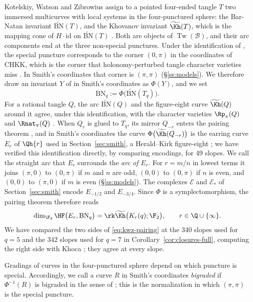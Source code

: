 Kotelskiy, Watson and Zibrowius assign to a pointed four-ended tangle $T$ two immersed multicurves
with local systems in the four-punctured sphere: the Bar-Natan invariant $\widetilde{\mathrm{BN}}(T)$,
and the Khovanov invariant $\widetilde{\Kh}(T)$, which is the mapping cone of $H\cdot\mathrm{id}$ on
$\widetilde{\mathrm{BN}}(T)$ \cite[Def.~6.5]{KWZ}.  Both are objects of $\operatorname{Tw}(\mathcal B)$,
and their arc components end at the three non-special punctures.  Under the identification of
\cite[\S8.2]{KWZ}, the special puncture corresponds to the
corner $(0,\pi)$ in the coordinates of CHKK, which is the corner that
holonomy-perturbed tangle character varieties miss \cite[Prop.~11.1 and \S11.6]{CHKK}.  In Smith's coordinates
that corner is $(\pi,\pi)$ (\S\ref{ss:models}).  We therefore draw an invariant $Y$ of \cite{KWZ} in Smith's
coordinates as $\Phi(Y)$, and we set
\[
 \mathrm{BN}_q:=\Phi\bigl(\widetilde{\mathrm{BN}}(T_q)\bigr).
\]
For a rational tangle $Q$, the arc $\widetilde{\mathrm{BN}}(Q)$ and the figure-eight curve
$\widetilde{\Kh}(Q)$ around it agree, under this identification, with the character varieties
$\Rp_\pi(Q)$ and $\Rnat_\pi(Q)$ \cite[\S1.8 and \S8.2]{KWZ}.  When $Q_r$ is glued to $T_q$, its
mirror $Q_{-r}$ enters the pairing theorem \cite[Thm.~1.9]{KWZ}, and in Smith's coordinates the curve
$\Phi\bigl(\widetilde{\Kh}(Q_{-r})\bigr)$ is the earring curve $E_r$ of $\Qh{r}$ used in
Section~\ref{sec:smith}, a Herald--Kirk figure-eight \cite[Def.~6.7]{HK}; we have verified this
identification directly, by comparing encodings, for 49 slopes.  We call the straight arc that $E_r$
surrounds the \emph{arc of $E_r$}.  For $r=m/n$ in lowest terms it joins $(\pi,0)$ to $(0,\pi)$ if $m$
and $n$ are odd, $(0,0)$ to $(0,\pi)$ if $n$ is even, and $(0,0)$ to $(\pi,0)$ if $m$ is even
(\S\ref{ss:models}).  The complexes $\mathcal E$ and $\mathcal E_*$ of
Section~\ref{sec:smith} encode $E_{-1/2}$ and $E_{-3/4}$.  Since $\Phi$ is a symplectomorphism, the
pairing theorem therefore reads
\begin{equation}\label{eq:kwz-pairing}
 \dim_{\F_2}\HF\bigl(E_r,\mathrm{BN}_q\bigr)=\rk\widetilde{\Kh}\bigl(K_r(q);\F_2\bigr),
 \qquad r\in\Q\cup\{\infty\}.
\end{equation}
We have compared the two sides of \eqref{eq:kwz-pairing} at the 340 slopes used for $q=5$ and the 342
slopes used for $q=7$ in Corollary~\ref{cor:closures-full}, computing the right side with Khoca
\cite{Khoca}; they agree at every slope.

Gradings of curves in the four-punctured sphere depend on which puncture is special.  Accordingly, we call a
curve $R$ in Smith's coordinates \emph{bigraded} if $\Phi^{-1}(R)$ is bigraded in the sense of \cite{KWZ}; this is the
normalization in which $(\pi,\pi)$ is the special puncture.

